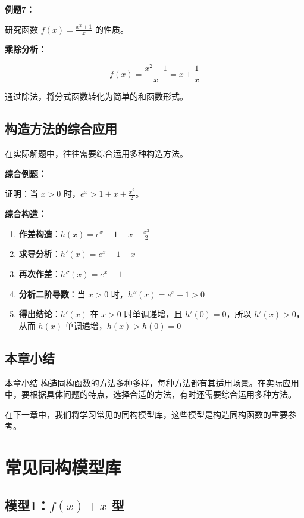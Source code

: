 \documentclass[a4paper,11pt]{ctexrep}
\newcommand{\exampleicon}{\ModeBadge[highlight]{例题}}
\newcommand{\analysisicon}{\ModeBadge[secondary]{分析}}
\theoremstyle{definition}
\begin{document}
\exampleicon \textbf{例题7：}

研究函数 $f(x) = \frac{x^2 + 1}{x}$ 的性质。

\analysisicon \textbf{乘除分析：}

$$f(x) = \frac{x^2 + 1}{x} = x + \frac{1}{x}$$

通过除法，将分式函数转化为简单的和函数形式。

\section{构造方法的综合应用}

在实际解题中，往往需要综合运用多种构造方法。

\exampleicon \textbf{综合例题：}

证明：当 $x > 0$ 时，$e^x > 1 + x + \frac{x^2}{2}$。

\analysisicon \textbf{综合构造：}

\begin{enumerate}
    \item \textbf{作差构造}：$h(x) = e^x - 1 - x - \frac{x^2}{2}$
    \item \textbf{求导分析}：$h'(x) = e^x - 1 - x$
    \item \textbf{再次作差}：$h''(x) = e^x - 1$
    \item \textbf{分析二阶导数}：当 $x > 0$ 时，$h''(x) = e^x - 1 > 0$
    \item \textbf{得出结论}：$h'(x)$ 在 $x > 0$ 时单调递增，且 $h'(0) = 0$，所以 $h'(x) > 0$，从而 $h(x)$ 单调递增，$h(x) > h(0) = 0$
\end{enumerate}

\section{本章小结}

\begin{summarybox}{本章小结}
构造同构函数的方法多种多样，每种方法都有其适用场景。在实际应用中，要根据具体问题的特点，选择合适的方法，有时还需要综合运用多种方法。

在下一章中，我们将学习常见的同构模型库，这些模型是构造同构函数的重要参考。
\end{summarybox}

\chapter{常见同构模型库}

\section{模型1：$f(x) \pm x$ 型}
\end{document}
